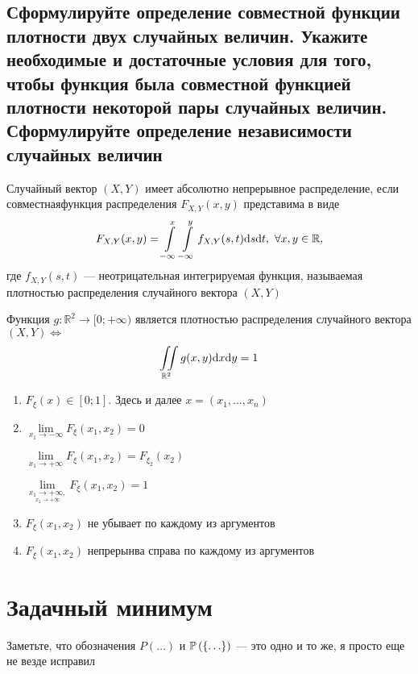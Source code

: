 \documentclass{article}
\begin{document}
\subsection{Сформулируйте определение совместной функции плотности двух случайных величин. Укажите необходимые и достаточные условия для того, чтобы функция была совместной функцией плотности некоторой пары случайных величин. Сформулируйте определение независимости случайных величин}
 Случайный вектор $(X,Y)$ имеет абсолютно непрерывное распределение, если совместнаяфункция распределения $F_{X,Y}(x,y)$ представима в виде
\begin{equation*}
    F_{X,Y}(x,y)=\int\limits_{-\infty}^{x}\int\limits_{-\infty}^{y} f_{X,Y}(s,t)\text{d}s\text{d}t,\ \forall x,y\in\mathbb{R},
\end{equation*}
где $f_{X,Y}(s,t)$ — неотрицательная интегрируемая функция, называемая плотностью распределения случайного вектора $(X,Y)$

\theorem Функция $g:\mathbb{R}^2\to[0;+\infty)$ является плотностью распределения случайного вектора $(X,Y)\Longleftrightarrow$
\begin{equation*}
    \iint\limits_{\mathbb{R}^2}g(x,y)\text{d}x\text{d}y=1
\end{equation*} 

\theorem
\begin{enumerate}
    \item $F_{\xi}(x)\in[0;1]$. Здесь и далее $x=(x_1,\ldots,x_n)$
    \item $\lim\limits_{x_1\rightarrow-\infty}F_{\xi}(x_1,x_2)=0$
    
    $\lim\limits_{x_1\rightarrow+\infty}F_{\xi}(x_1,x_2)=F_{\xi_2}(x_2)$

    $\lim\limits_{\underset{x_2\rightarrow+\infty}{x_1\rightarrow+\infty,}}F_{\xi}(x_1,x_2)=1$
    \item $F_{\xi}(x_1,x_2)$ не убывает по каждому из аргументов
    \item $F_{\xi}(x_1,x_2)$ непрерынва справа по каждому из аргументов
\end{enumerate}


\newpage
\section{Задачный минимум}
Заметьте, что обозначения $P(\ldots)$ и $\mathbb{P}\left(\{\ldots\}\right)$ — это одно и то же, я просто еще не везде исправил
\end{document}

